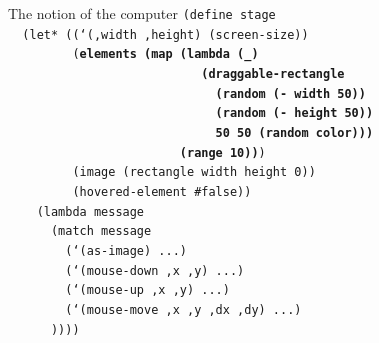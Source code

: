 \documentclass{beamer}
\begin{document}
\begin{frame}{The notion of the computer}
  \scriptsize
  \texttt{(define stage\\
    \ \ (let* ((`(,width ,height) (screen-size))\\
    \ \ \ \ \ \ \ \ \ (\textbf{elements (map (lambda (\_)\\
      \ \ \ \ \ \ \ \ \ \ \ \ \ \ \ \ \ \ \ \ \ \ \ \ \ \ \ (draggable-rectangle\\
      \ \ \ \ \ \ \ \ \ \ \ \ \ \ \ \ \ \ \ \ \ \ \ \ \ \ \ \ \ (random (- width 50))\\
      \ \ \ \ \ \ \ \ \ \ \ \ \ \ \ \ \ \ \ \ \ \ \ \ \ \ \ \ \ (random (- height 50))\\
      \ \ \ \ \ \ \ \ \ \ \ \ \ \ \ \ \ \ \ \ \ \ \ \ \ \ \ \ \ 50 50 (random color)))\\
      \ \ \ \ \ \ \ \ \ \ \ \ \ \ \ \ \ \ \ \ \ \ \ \ (range 10))})\\
    \ \ \ \ \ \ \ \ \ (image (rectangle width height 0))\\
    \ \ \ \ \ \ \ \ \ (hovered-element \#false))\\
    \ \ \ \ (lambda message\\
    \ \ \ \ \ \ (match message\\
    \ \ \ \ \ \ \ \ (`(as-image) ...)\\
    \ \ \ \ \ \ \ \ (`(mouse-down ,x ,y) ...)\\
    \ \ \ \ \ \ \ \ (`(mouse-up ,x ,y) ...)\\
    \ \ \ \ \ \ \ \ (`(mouse-move ,x ,y ,dx ,dy) ...)\\
    \ \ \ \ \ \ ))))\\
    \ \\
    \ \\
    \ \\
    \ \\
    \ \\
    \ \\
    \ 
}
\end{frame}
\end{document}
